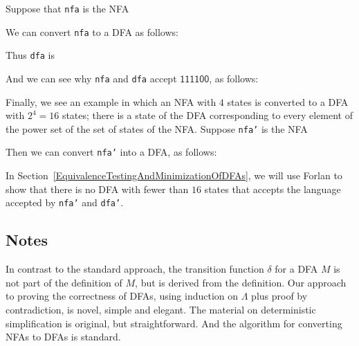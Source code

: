 Suppose that \texttt{nfa} is the NFA
\begin{center}

\end{center}
We can convert \texttt{nfa} to a DFA as follows:

Thus \texttt{dfa} is
\begin{center}

\end{center}
And we can see why \texttt{nfa} and \texttt{dfa} accept
$\mathsf{111100}$, as follows:


Finally, we see an example in which an NFA with $4$ states
is converted to a DFA with $2^4=16$ states; there is a state of the
DFA corresponding to every element of the power set of
the set of states of the NFA.  Suppose \texttt{nfa'} is
the NFA
\begin{center}

\end{center}
Then we can convert \texttt{nfa'} into a DFA, as follows:

In Section~\ref{EquivalenceTestingAndMinimizationOfDFAs},
we will use Forlan to show that there is no
DFA with fewer than $16$ states that accepts the language accepted
%
by \texttt{nfa'} and \texttt{dfa'}.

\subsection{Notes}

In contrast to the standard approach, the transition function $\delta$
for a DFA $M$ is not part of the definition of $M$, but is derived from
the definition.  Our approach to proving the correctness of DFAs,
using induction on $\Lambda$ plus proof by contradiction, is novel,
simple and elegant.  The material on deterministic simplification is
original, but straightforward.  And the algorithm for converting NFAs
to DFAs is standard.

%
%
%

